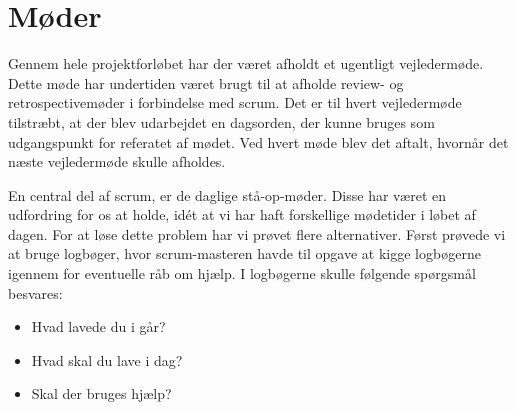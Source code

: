\section{Møder}
Gennem hele projektforløbet har der været afholdt et ugentligt vejledermøde. Dette møde har undertiden været brugt til at afholde review- og retrospectivemøder i forbindelse med scrum. Det er til hvert vejledermøde tilstræbt, at der blev udarbejdet en dagsorden, der kunne bruges som udgangspunkt for referatet af mødet. Ved hvert møde blev det aftalt, hvornår det næste vejledermøde skulle afholdes. 


En central del af scrum, er de daglige stå-op-møder. Disse har været en udfordring for os at holde, idét at vi har haft forskellige mødetider i løbet af dagen. For at løse dette problem har vi prøvet flere alternativer. Først prøvede vi at bruge logbøger, hvor scrum-masteren havde til opgave at kigge logbøgerne igennem for eventuelle råb om hjælp. I logbøgerne skulle følgende spørgsmål besvares:

\begin{itemize}
	\item Hvad lavede du i går?
	\item Hvad skal du lave i dag?
	\item Skal der bruges hjælp?
\end{itemize} 


